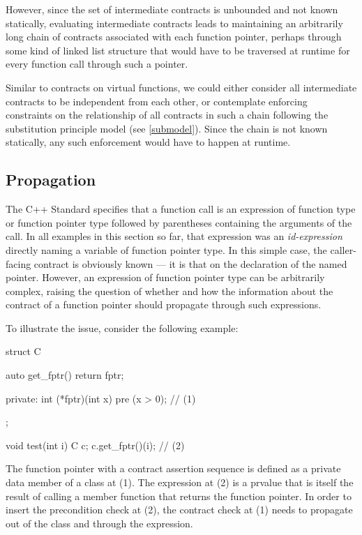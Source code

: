 However, since the set of intermediate contracts is unbounded and not known statically, evaluating intermediate contracts leads to maintaining an arbitrarily long chain of contracts associated with each function pointer, perhaps through some kind of linked list structure that would have to be traversed at runtime for every function call through such a pointer. 

Similar to contracts on virtual functions, we could either consider all intermediate contracts to be independent from each other, or contemplate enforcing constraints on the relationship of all contracts in such a chain following the substitution principle model (see \ref{submodel}). Since the chain is not known statically, any such enforcement would have to happen at runtime.

\subsection{Propagation}
\label{expr}

The C++ Standard specifies that a function call is an expression of function type or function pointer type followed by parentheses containing the arguments of the call. In all examples in this section so far, that expression was an \emph{id-expression} directly naming a variable of function pointer type. In this simple case, the caller-facing contract is obviously known --- it is that on the declaration of the named pointer. However, an expression of function pointer type can be arbitrarily complex, raising the question of whether and how the information about the contract of a function pointer should propagate through such expressions.

To illustrate the issue, consider the following example:
\begin{codeblock}
struct C {
  auto get_fptr() { return fptr; }
  
private:
  int (*fptr)(int x) pre (x > 0);  // (1)
};

void test(int i) {
  C c;
  c.get_fptr()(i);  // (2)
}
\end{codeblock}
The function pointer with a contract assertion sequence is defined as a private data member of a class at (1). The expression at (2) is a prvalue that is itself the result of calling a member function that returns the function pointer. In order to insert the precondition check at (2), the contract check at (1) needs to propagate out of the class and through the expression.


